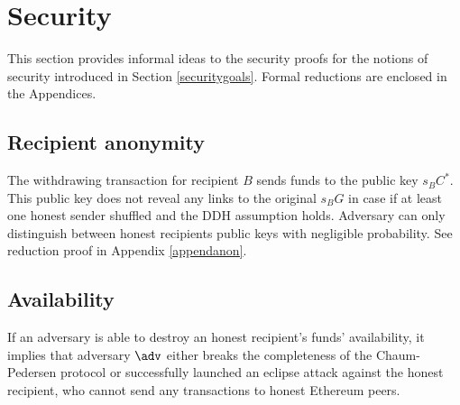 \documentclass[a4paper]{article}
\theoremstyle{definition}
\begin{document}
\section{Security}
This section provides informal ideas to the security proofs for the notions of security introduced in Section \ref{securitygoals}. Formal reductions are enclosed in the Appendices.

\subsection{Recipient anonymity}
The withdrawing transaction for recipient $B$ sends funds to the public key $s_{B}C^{*}$. This public key does not reveal any links to the original $s_{B}G$ in case if at least one honest sender shuffled and the DDH assumption holds. Adversary can only distinguish between honest recipients public keys with negligible probability. See reduction proof in Appendix \ref*{appendanon}.
\subsection{Availability}
If an adversary is able to destroy an honest recipient's funds' availability, it implies that adversary $\adv$ either breaks the completeness of the Chaum-Pedersen protocol or successfully launched an eclipse attack against the honest recipient, who cannot send any transactions to honest Ethereum peers.
\end{document}
